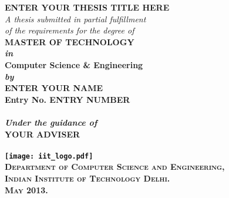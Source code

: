 \begin{titlepage}
\begin{center}

\LARGE{\textsf{\bfseries ENTER YOUR THESIS TITLE HERE}}\\
\vspace{20pt}
\normalsize
\emph{A thesis submitted in partial fulfillment} \\
\emph{of the requirements for the degree of} \\
\vspace{20pt}
\bfseries MASTER OF TECHNOLOGY \\
\vspace{20pt}
\emph {in}\\
\vspace{20pt}
\bfseries Computer Science \& Engineering \\
\vspace{20pt}
\emph {by}\\
\vspace{20pt}
\Large{\textsf{\bfseries ENTER YOUR NAME}} \\
{\normalsize \textsf{\bfseries Entry No. ENTRY NUMBER}}\\
\ \\
{\normalsize \emph {Under the guidance of}}
\ \\
\Large{\textsf{\bfseries YOUR ADVISER}} \\
\ \\
\vspace{30pt}
\texttt{[image: iit\_logo.pdf]} \\
\vspace{10pt}
\large{\textsc{Department of Computer Science and Engineering,\\
Indian Institute of Technology Delhi.\\ May 2013.}}
\end{center}
\end{titlepage}
